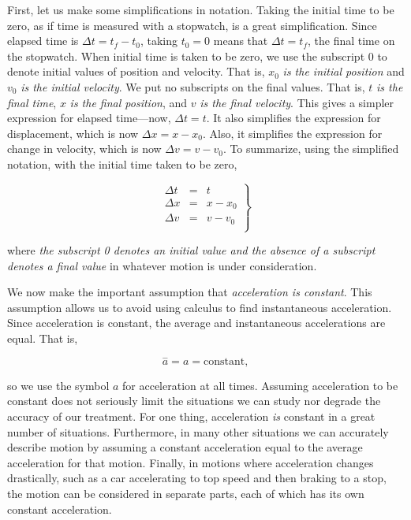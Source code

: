 \documentclass[
]{book}
\begin{document}
First, let us make some simplifications in notation. Taking the initial
time to be zero, as if time is measured with a stopwatch, is a great
simplification. Since elapsed time is \({\Delta t = {t_{f} - t_{0}}}{}\),
taking \({t_{0} = 0}{}\) means that \({\Delta t = t_{f}}{}\), the final time
on the stopwatch. When initial time is taken to be zero, we use the
subscript 0 to denote initial values of position and velocity. That is,
\(x_{0}\) \emph{is the initial position} and \(v_{0}{}\) \emph{is the initial
velocity}. We put no subscripts on the final values. That is, \(t\) \emph{is
the final time}, \(x{}\) \emph{is the final position}, and \(v\) \emph{is the final
velocity}. This gives a simpler expression for elapsed time---now,
\({\Delta t = t}{}\). It also simplifies the expression for displacement,
which is now \(\Delta x = {x - x_{0}}\). Also, it simplifies the
expression for change in velocity, which is now
\({\Delta v = {v - v_{0}}}{}\). To summarize, using the simplified
notation, with the initial time taken to be zero,

\leavevmode\hypertarget{import-auto-id2563693}{}%
\[\left. \begin{array}{lll}
{\Delta t} & = & t \\
{\Delta x} & = & {x - x_{0}} \\
{\Delta v} & = & {v - v_{0}} \\
\end{array} \right\}\]

where \emph{the subscript 0 denotes an initial value and the absence of a
subscript denotes a final value} in whatever motion is under
consideration.

We now make the important assumption that \emph{acceleration is constant}.
This assumption allows us to avoid using calculus to find instantaneous
acceleration. Since acceleration is constant, the average and
instantaneous accelerations are equal. That is,

\leavevmode\hypertarget{import-auto-id1819116}{}%
\[{{{\overset{-}{a} = a} = \text{constant}},}{}\]

so we use the symbol \(a{}\) for acceleration at all times. Assuming
acceleration to be constant does not seriously limit the situations we
can study nor degrade the accuracy of our treatment. For one thing,
acceleration \emph{is} constant in a great number of situations. Furthermore,
in many other situations we can accurately describe motion by assuming a
constant acceleration equal to the average acceleration for that motion.
Finally, in motions where acceleration changes drastically, such as a
car accelerating to top speed and then braking to a stop, the motion can
be considered in separate parts, each of which has its own constant
acceleration.
\end{document}
